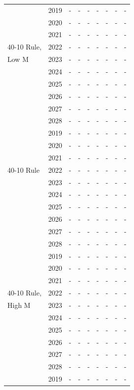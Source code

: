\documentclass[12pt,]{article}
\begin{document}
\begin{table}[ht]
{\begin{tabular}{l|cc|>{\centering}p{.7in}c|>{\centering}p{.7in}c|>{\centering}p{.7in}c}
  \hline
 & 2019 & - & - & - & - & - & - & - \\ 
   & 2020 & - & - & - & - & - & - & - \\ 
   & 2021 & - & - & - & - & - & - & - \\ 
  40-10 Rule,  & 2022 & - & - & - & - & - & - & - \\ 
  Low M & 2023 & - & - & - & - & - & - & - \\ 
   & 2024 & - & - & - & - & - & - & - \\ 
   & 2025 & - & - & - & - & - & - & - \\ 
   & 2026 & - & - & - & - & - & - & - \\ 
   & 2027 & - & - & - & - & - & - & - \\ 
   & 2028 & - & - & - & - & - & - & - \\ 
   \hline
 & 2019 & - & - & - & - & - & - & - \\ 
   & 2020 & - & - & - & - & - & - & - \\ 
   & 2021 & - & - & - & - & - & - & - \\ 
  40-10 Rule & 2022 & - & - & - & - & - & - & - \\ 
   & 2023 & - & - & - & - & - & - & - \\ 
   & 2024 & - & - & - & - & - & - & - \\ 
   & 2025 & - & - & - & - & - & - & - \\ 
   & 2026 & - & - & - & - & - & - & - \\ 
   & 2027 & - & - & - & - & - & - & - \\ 
   & 2028 & - & - & - & - & - & - & - \\ 
   \hline
 & 2019 & - & - & - & - & - & - & - \\ 
   & 2020 & - & - & - & - & - & - & - \\ 
   & 2021 & - & - & - & - & - & - & - \\ 
  40-10 Rule, & 2022 & - & - & - & - & - & - & - \\ 
  High M & 2023 & - & - & - & - & - & - & - \\ 
   & 2024 & - & - & - & - & - & - & - \\ 
   & 2025 & - & - & - & - & - & - & - \\ 
   & 2026 & - & - & - & - & - & - & - \\ 
   & 2027 & - & - & - & - & - & - & - \\ 
   & 2028 & - & - & - & - & - & - & - \\ 
   \hline
 & 2019 & - & - & - & - & - & - & - \\ 

\end{tabular}}
\end{table}
\end{document}

